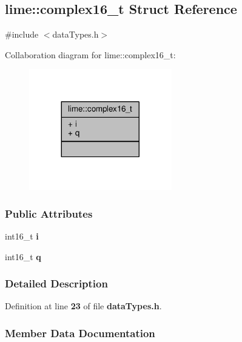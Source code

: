 \subsection{lime\+:\+:complex16\+\_\+t Struct Reference}
\label{structlime_1_1complex16__t}


{\ttfamily \#include $<$data\+Types.\+h$>$}



Collaboration diagram for lime\+:\+:complex16\+\_\+t\+:
\nopagebreak
\begin{figure}[H]
\begin{center}
\leavevmode
\includegraphics[width=176pt]{d0/d9e/structlime_1_1complex16__t__coll__graph}
\end{center}
\end{figure}
\subsubsection*{Public Attributes}
\begin{DoxyCompactItemize}
\item 
int16\+\_\+t {\bf i}
\item 
int16\+\_\+t {\bf q}
\end{DoxyCompactItemize}


\subsubsection{Detailed Description}


Definition at line {\bf 23} of file {\bf data\+Types.\+h}.



\subsubsection{Member Data Documentation}
